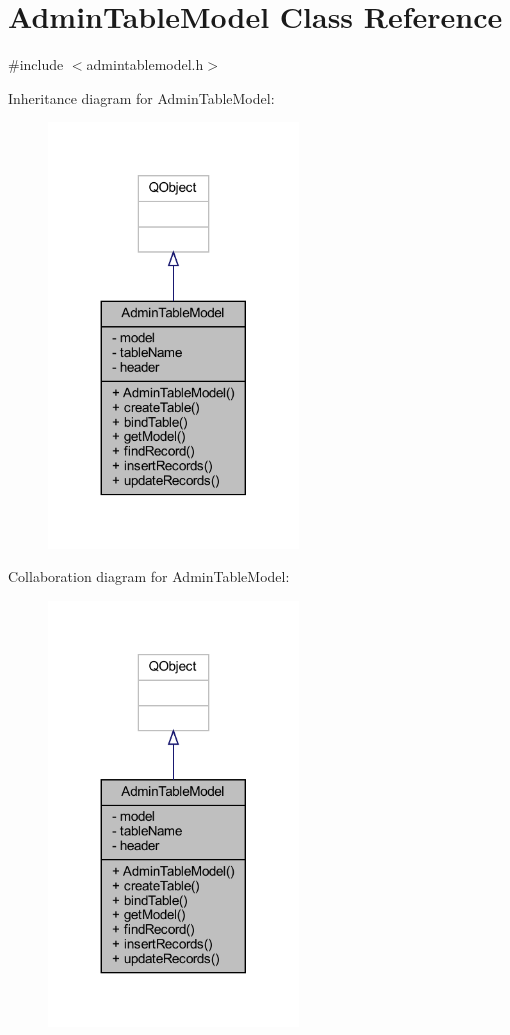 \hypertarget{class_admin_table_model}{}\section{Admin\+Table\+Model Class Reference}
\label{class_admin_table_model}


{\ttfamily \#include $<$admintablemodel.\+h$>$}



Inheritance diagram for Admin\+Table\+Model\+:
\nopagebreak
\begin{figure}[H]
\begin{center}
\leavevmode
\includegraphics[width=188pt]{class_admin_table_model__inherit__graph}
\end{center}
\end{figure}


Collaboration diagram for Admin\+Table\+Model\+:
\nopagebreak
\begin{figure}[H]
\begin{center}
\leavevmode
\includegraphics[width=188pt]{class_admin_table_model__coll__graph}
\end{center}
\end{figure}
